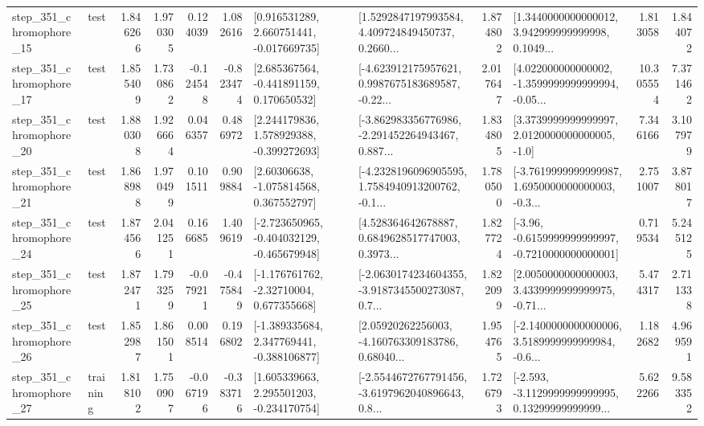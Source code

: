 \begin{tabular}{llrrrrllrlrr}
  step\_351\_chromophore\_15 &      test &      1.846266 &    1.970305 &      0.124039 &  1.082616 &    [0.916531289, 2.660751441, -0.017669735] &  [1.5292847197993584, 4.409724849450737, 0.2660... &       1.874802 &  [1.3440000000000012, 3.942999999999998, 0.1049... &            1.813058 &          1.844072 \\
  step\_351\_chromophore\_17 &      test &      1.855409 &    1.730862 &     -0.124548 & -0.823474 &    [2.685367564, -0.441891159, 0.170650532] &  [-4.623912175957621, 0.9987675183689587, -0.22... &       2.017647 &  [4.022000000000002, -1.3599999999999994, -0.05... &           10.305554 &          7.371462 \\
  step\_351\_chromophore\_20 &      test &      1.880308 &    1.926664 &      0.046357 &  0.486972 &    [2.244179836, 1.578929388, -0.399272693] &  [-3.862983356776986, -2.291452264943467, 0.887... &       1.834805 &     [3.3739999999999997, 2.0120000000000005, -1.0] &            7.346166 &          3.107979 \\
  step\_351\_chromophore\_21 &      test &      1.868988 &    1.970499 &      0.101511 &  0.909884 &     [2.60306638, -1.075814568, 0.367552797] &  [-4.2328196096905595, 1.7584940913200762, -0.1... &       1.780500 &  [-3.7619999999999987, 1.6950000000000003, -0.3... &            2.751007 &          3.878017 \\
  step\_351\_chromophore\_24 &      test &      1.874566 &    2.041251 &      0.166685 &  1.409619 &  [-2.723650965, -0.404032129, -0.465679948] &  [4.528364642678887, 0.6849628517747003, 0.3973... &       1.827724 &  [-3.96, -0.6159999999999997, -0.7210000000000001] &            0.719534 &          5.245125 \\
  step\_351\_chromophore\_25 &      test &      1.872471 &    1.793259 &     -0.079211 & -0.475849 &    [-1.176761762, -2.32710004, 0.677355668] &  [-2.0630174234604355, -3.9187345500273087, 0.7... &       1.822099 &  [2.0050000000000003, 3.4339999999999975, -0.71... &            5.474317 &          2.711338 \\
  step\_351\_chromophore\_26 &      test &      1.852987 &    1.861501 &      0.008514 &  0.196802 &   [-1.389335684, 2.347769441, -0.388106877] &  [2.05920262256003, -4.160763309183786, 0.68040... &       1.954765 &  [-2.1400000000000006, 3.5189999999999984, -0.6... &            1.182682 &          4.969591 \\
  step\_351\_chromophore\_27 &  training &      1.818102 &    1.750907 &     -0.067196 & -0.383716 &    [1.605339663, 2.295501203, -0.234170754] &  [-2.5544672767791456, -3.6197962040896643, 0.8... &       1.726793 &  [-2.593, -3.1129999999999995, 0.13299999999999... &            5.622266 &          9.583352 \\

\end{tabular}
